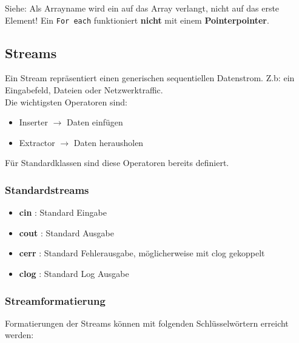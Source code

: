 

Siehe: Als Arrayname wird ein  auf das Array verlangt, nicht auf das erste Element!  
Ein \verb|For each| funktioniert \textbf{nicht} mit einem \textbf{Pointerpointer}. 

\subsection{Streams}

Ein Stream repräsentiert einen generischen sequentiellen Datenstrom. Z.b: ein Eingabefeld, Dateien oder Netzwerktraffic.\\
Die wichtigsten Operatoren sind:

\begin{itemize}[itemsep=1pt, parsep=0pt]
    \item \say{$<<$} Inserter $\rightarrow$  Daten einfügen
    \item \say{$>>$} Extractor $\rightarrow$ Daten herausholen
\end{itemize}

Für Standardklassen sind diese Operatoren bereits definiert.

\subsubsection{Standardstreams}

\begin{itemize}[itemsep=1pt, parsep=0pt]
    \item \textbf{cin} : Standard Eingabe
    \item \textbf{cout} : Standard Ausgabe
    \item \textbf{cerr} : Standard Fehlerausgabe, möglicherweise mit clog gekoppelt 
    \item \textbf{clog} : Standard Log Ausgabe 
\end{itemize}

\subsubsection{Streamformatierung}

Formatierungen der Streams können mit folgenden Schlüsselwörtern erreicht werden:


